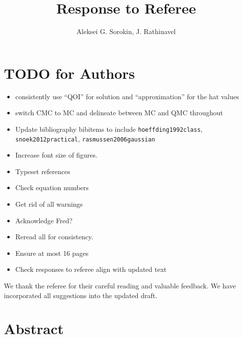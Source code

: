 \documentclass{article}[12pt]
\title{Response to Referee}
\author{Aleksei G. Sorokin, J. Rathinavel}
\date{}
\newcommand{\MISCComment}[1]{{\color{purple} #1}}
\begin{document}
\maketitle    

\MISCComment{
    \section*{TODO for Authors}
    \begin{itemize}
        \item consistently use ``QOI'' for solution and ``approximation'' for the hat values
        \item switch CMC to MC and delineate between MC and QMC throughout
        \item Update bibliography bibitems to include \texttt{hoeffding1992class}, \texttt{snoek2012practical}, \texttt{rasmussen2006gaussian}
        \item Increase font size of figures. 
        \item Typeset references 
        \item Check equation numbers
        \item Get rid of all warnings 
        \item Acknowledge Fred?
        \item Reread all for consistency.
        \item Ensure at most 16 pages
        \item Check responses to referee align with updated text
    \end{itemize}}

We thank the referee for their careful reading and valuable feedback. We have incorporated all suggestions into the updated draft. 

\section*{Abstract}
\end{document}
